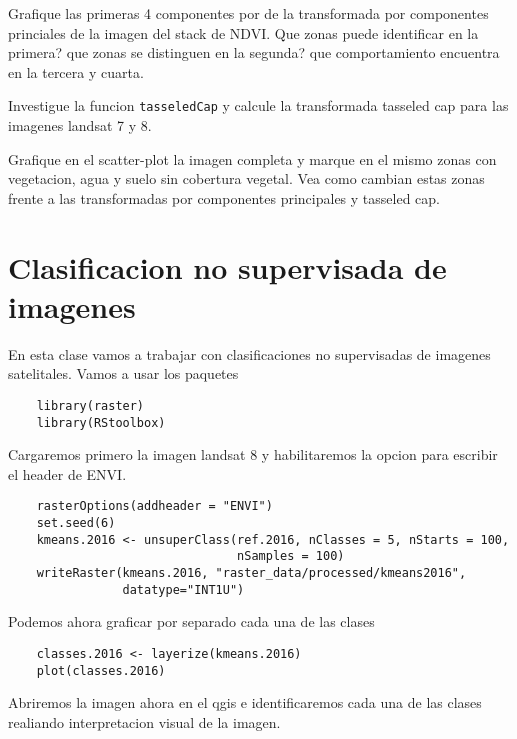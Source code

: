 \documentclass[a4paper]{article}
\begin{document}
\begin{act}
    Grafique las primeras 4 componentes por de la transformada por componentes
    princiales de la imagen del stack de NDVI\@. Que zonas puede identificar en la
    primera? que zonas se distinguen en la segunda? que comportamiento encuentra
    en la tercera y cuarta.
\end{act}

\begin{act}
    Investigue la funcion \texttt{tasseledCap} y calcule la transformada
    tasseled cap para las imagenes landsat 7 y 8.
\end{act}

\begin{act}
    Grafique en el scatter-plot la imagen completa y marque en el mismo zonas
    con vegetacion, agua y suelo sin cobertura vegetal. Vea como cambian estas
    zonas frente a las transformadas por componentes principales y tasseled cap.
\end{act}

\section{Clasificacion no supervisada de imagenes}
\label{sec:nosup}
En esta clase vamos a trabajar con clasificaciones no supervisadas de imagenes
satelitales. Vamos a usar los paquetes

\begin{lstlisting}
    library(raster)
    library(RStoolbox)
\end{lstlisting}

Cargaremos primero la imagen landsat 8 y habilitaremos la opcion para escribir
el header de ENVI\@.

\begin{lstlisting}
    rasterOptions(addheader = "ENVI")
    set.seed(6)
    kmeans.2016 <- unsuperClass(ref.2016, nClasses = 5, nStarts = 100,
                                nSamples = 100)
    writeRaster(kmeans.2016, "raster_data/processed/kmeans2016",
                datatype="INT1U")
\end{lstlisting}

Podemos ahora graficar por separado cada una de las clases

\begin{lstlisting}
    classes.2016 <- layerize(kmeans.2016)
    plot(classes.2016)
\end{lstlisting}

Abriremos la imagen ahora en el qgis e identificaremos cada una de las clases
realiando interpretacion visual de la imagen. 
\end{document}
